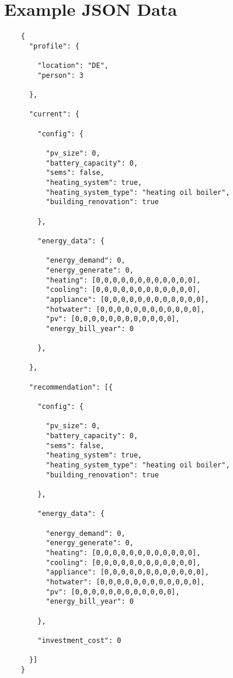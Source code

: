 \clearpage %

\chapter{Example JSON Data}
\label{appendix:example_JSON}

\begin{verbatim}
    {
      "profile": {
    
        "location": "DE",
        "person": 3
    
      },
    
      "current": {
    
        "config": {
    
          "pv_size": 0,
          "battery_capacity": 0,
          "sems": false,
          "heating_system": true,
          "heating_system_type": "heating oil boiler",
          "building_renovation": true
    
        },
    
        "energy_data": {
    
          "energy_demand": 0,
          "energy_generate": 0,
          "heating": [0,0,0,0,0,0,0,0,0,0,0,0],
          "cooling": [0,0,0,0,0,0,0,0,0,0,0,0],
          "appliance": [0,0,0,0,0,0,0,0,0,0,0,0],
          "hotwater": [0,0,0,0,0,0,0,0,0,0,0,0],
          "pv": [0,0,0,0,0,0,0,0,0,0,0,0],
          "energy_bill_year": 0
    
        },
    
      },
    
      "recommendation": [{
    
        "config": {
    
          "pv_size": 0,
          "battery_capacity": 0,
          "sems": false,
          "heating_system": true,
          "heating_system_type": "heating oil boiler",
          "building_renovation": true
    
        },
    
        "energy_data": {
    
          "energy_demand": 0,
          "energy_generate": 0,
          "heating": [0,0,0,0,0,0,0,0,0,0,0,0],
          "cooling": [0,0,0,0,0,0,0,0,0,0,0,0],
          "appliance": [0,0,0,0,0,0,0,0,0,0,0,0],
          "hotwater": [0,0,0,0,0,0,0,0,0,0,0,0],
          "pv": [0,0,0,0,0,0,0,0,0,0,0,0],
          "energy_bill_year": 0
    
        },
    
        "investment_cost": 0
    
      }]
    }
    \end{verbatim}
    
    